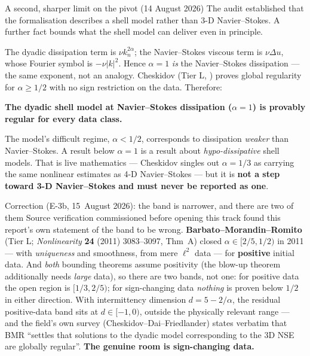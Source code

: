 \documentclass[11pt,a4paper]{article}
\newcommand{\tL}{\textsf{Tier L}}
\theoremstyle{definition}
\theoremstyle{plain}
\begin{document}
\begin{warnbox}{A second, sharper limit on the pivot (14 August 2026)}
The audit established that the formalisation describes a shell model rather than 3-D
Navier--Stokes. A further fact bounds what the shell model can deliver even in principle.

The dyadic dissipation term is $\nu k_n^{2\alpha}$; the Navier--Stokes viscous term is
$\nu\Delta u$, whose Fourier symbol is $-\nu|k|^2$. Hence $\alpha=1$ \emph{is} the
Navier--Stokes dissipation --- the same exponent, not an analogy. Cheskidov (\tL{},
\cite{cheskidov}) proves global regularity for $\alpha\ge1/2$ with no sign restriction on the
data. Therefore:

\begin{center}
\textbf{The dyadic shell model at Navier--Stokes dissipation ($\alpha=1$) is provably regular
for every data class.}
\end{center}

The model's difficult regime, $\alpha<1/2$, corresponds to dissipation \emph{weaker} than
Navier--Stokes. A result below $\alpha=1$ is a result about \emph{hypo-dissipative}
shell models. That is live mathematics --- Cheskidov singles out $\alpha=1/3$ as carrying the
same nonlinear estimates as 4-D Navier--Stokes --- but it is
\textbf{not a step toward 3-D Navier--Stokes and must never be reported as one}.

\begin{keybox}{Correction (E-3b, 15~August 2026): the band is narrower, and there are two of them}
Source verification commissioned before opening this track found this report's own statement of
the band to be wrong. \textbf{Barbato--Morandin--Romito} (\tL{}; \emph{Nonlinearity} \textbf{24}
(2011) 3083--3097, Thm~A) closed $\alpha\in[2/5,1/2)$ in 2011 --- with \emph{uniqueness} and
smoothness, from mere $\ell^2$ data --- for \textbf{positive} initial data. And \emph{both}
bounding theorems assume positivity (the blow-up theorem additionally needs \emph{large} data),
so there are two bands, not one: for positive data the open region is $[1/3,2/5)$; for
sign-changing data \emph{nothing} is proven below $1/2$ in either direction. With intermittency
dimension $d=5-2/\alpha$, the residual positive-data band sits at $d\in[-1,0)$, outside the
physically relevant range --- and the field's own survey (Cheskidov--Dai--Friedlander) states
verbatim that BMR ``settles that solutions to the dyadic model corresponding to the 3D NSE are
globally regular''. \textbf{The genuine room is sign-changing data.}


\end{keybox}
\end{warnbox}
\end{document}
